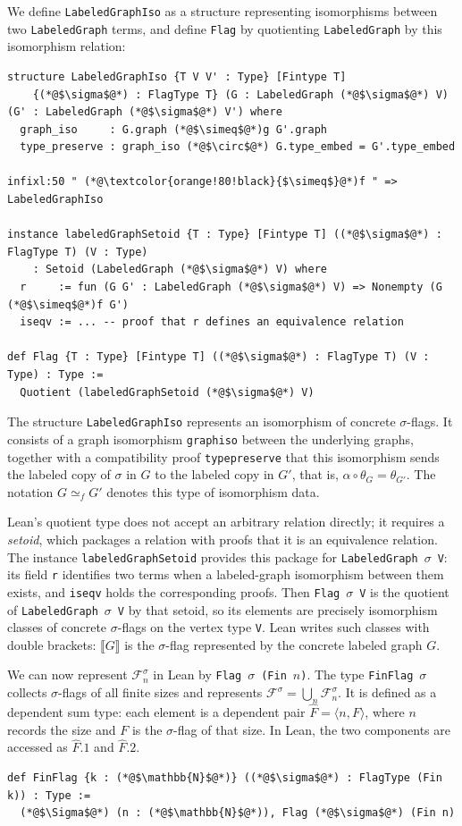 \documentclass[acmsmall,screen=true,acmthm=false]{acmart}
\DeclareRobustCommand{\lean}[1]{{\def\_{\textunderscore\allowbreak}\texttt{#1}}}
\begin{document}
We define \lean{LabeledGraphIso} as a structure representing isomorphisms
between two \lean{LabeledGraph} terms, and define \lean{Flag} by quotienting
\lean{LabeledGraph} by this isomorphism relation:
\begin{lstlisting}
structure LabeledGraphIso {T V V' : Type} [Fintype T]
    {(*@$\sigma$@*) : FlagType T} (G : LabeledGraph (*@$\sigma$@*) V) (G' : LabeledGraph (*@$\sigma$@*) V') where
  graph_iso     : G.graph (*@$\simeq$@*)g G'.graph
  type_preserve : graph_iso (*@$\circ$@*) G.type_embed = G'.type_embed

infixl:50 " (*@\textcolor{orange!80!black}{$\simeq$}@*)f " => LabeledGraphIso

instance labeledGraphSetoid {T : Type} [Fintype T] ((*@$\sigma$@*) : FlagType T) (V : Type)
    : Setoid (LabeledGraph (*@$\sigma$@*) V) where
  r     := fun (G G' : LabeledGraph (*@$\sigma$@*) V) => Nonempty (G (*@$\simeq$@*)f G')
  iseqv := ... -- proof that r defines an equivalence relation

def Flag {T : Type} [Fintype T] ((*@$\sigma$@*) : FlagType T) (V : Type) : Type :=
  Quotient (labeledGraphSetoid (*@$\sigma$@*) V)
\end{lstlisting}
The structure \lean{LabeledGraphIso} represents an isomorphism of concrete
$\sigma$-flags.
It consists of a graph isomorphism \lean{graph\_iso} between the underlying
graphs, together with a compatibility proof \lean{type\_preserve} that this
isomorphism sends the labeled copy of $\sigma$ in $G$ to the labeled copy in
$G'$, that is, $\alpha\circ\theta_G=\theta_{G'}$.  The notation
$G\simeq_f G'$ denotes this type of isomorphism data.

Lean's quotient type does not accept an arbitrary relation directly; it
requires a \emph{setoid}, which packages a relation with proofs that it is an
equivalence relation.  The instance \lean{labeledGraphSetoid} provides this
package for \lean{LabeledGraph}~$\sigma$~\lean{V}: its field \lean{r}
identifies two terms when a labeled-graph isomorphism between them exists, and
\lean{iseqv} holds the corresponding proofs.  Then
\lean{Flag}~$\sigma$~\lean{V} is the quotient of
\lean{LabeledGraph}~$\sigma$~\lean{V} by that setoid, so its elements are
precisely isomorphism classes of concrete $\sigma$-flags on the vertex type
\lean{V}.  Lean writes such classes with double brackets:
\(\llbracket G\rrbracket\) is the $\sigma$-flag represented by the concrete
labeled graph \(G\).

We can now represent $\mathcal{F}^\sigma_n$ in Lean by
\lean{Flag}~$\sigma$~\lean{(Fin}~$n$\lean{)}.  The type
\lean{FinFlag}~$\sigma$ collects $\sigma$-flags of all finite sizes and
represents $\mathcal{F}^\sigma = \bigcup_n \mathcal{F}^\sigma_n$.  It is
defined as a dependent sum type: each element is a dependent pair
$\hat F = \langle n, F\rangle$, where $n$ records the size and $F$ is the
$\sigma$-flag of that size.  In Lean, the two components are accessed as
$\hat F.1$ and $\hat F.2$.
\begin{lstlisting}
def FinFlag {k : (*@$\mathbb{N}$@*)} ((*@$\sigma$@*) : FlagType (Fin k)) : Type :=
  (*@$\Sigma$@*) (n : (*@$\mathbb{N}$@*)), Flag (*@$\sigma$@*) (Fin n)
\end{lstlisting}
\end{document}
